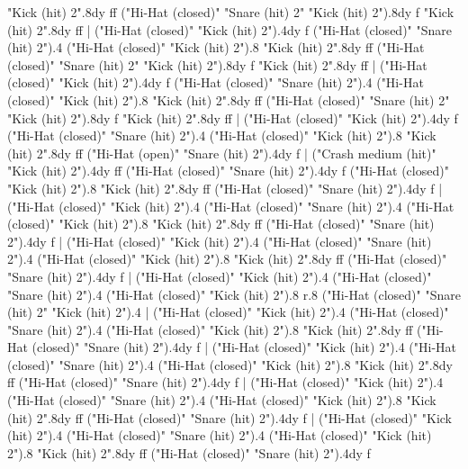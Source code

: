       "Kick (hit) 2".8{dy ff}
      ("Hi-Hat (closed)" "Snare (hit) 2" "Kick (hit) 2").8{dy f}
      "Kick (hit) 2".8{dy ff}
    |
      ("Hi-Hat (closed)" "Kick (hit) 2").4{dy f}
      ("Hi-Hat (closed)" "Snare (hit) 2").4
      ("Hi-Hat (closed)" "Kick (hit) 2").8
      "Kick (hit) 2".8{dy ff}
      ("Hi-Hat (closed)" "Snare (hit) 2" "Kick (hit) 2").8{dy f}
      "Kick (hit) 2".8{dy ff}
    |
      ("Hi-Hat (closed)" "Kick (hit) 2").4{dy f}
      ("Hi-Hat (closed)" "Snare (hit) 2").4
      ("Hi-Hat (closed)" "Kick (hit) 2").8
      "Kick (hit) 2".8{dy ff}
      ("Hi-Hat (closed)" "Snare (hit) 2" "Kick (hit) 2").8{dy f}
      "Kick (hit) 2".8{dy ff}
    |
      ("Hi-Hat (closed)" "Kick (hit) 2").4{dy f}
      ("Hi-Hat (closed)" "Snare (hit) 2").4
      ("Hi-Hat (closed)" "Kick (hit) 2").8
      "Kick (hit) 2".8{dy ff}
      ("Hi-Hat (open)" "Snare (hit) 2").4{dy f}
    |
      ("Crash medium (hit)" "Kick (hit) 2").4{dy ff}
      ("Hi-Hat (closed)" "Snare (hit) 2").4{dy f}
      ("Hi-Hat (closed)" "Kick (hit) 2").8
      "Kick (hit) 2".8{dy ff}
      ("Hi-Hat (closed)" "Snare (hit) 2").4{dy f}
    |
      ("Hi-Hat (closed)" "Kick (hit) 2").4
      ("Hi-Hat (closed)" "Snare (hit) 2").4
      ("Hi-Hat (closed)" "Kick (hit) 2").8
      "Kick (hit) 2".8{dy ff}
      ("Hi-Hat (closed)" "Snare (hit) 2").4{dy f}
    |
      ("Hi-Hat (closed)" "Kick (hit) 2").4
      ("Hi-Hat (closed)" "Snare (hit) 2").4
      ("Hi-Hat (closed)" "Kick (hit) 2").8
      "Kick (hit) 2".8{dy ff}
      ("Hi-Hat (closed)" "Snare (hit) 2").4{dy f}
    |
      ("Hi-Hat (closed)" "Kick (hit) 2").4
      ("Hi-Hat (closed)" "Snare (hit) 2").4
      ("Hi-Hat (closed)" "Kick (hit) 2").8
      r.8
      ("Hi-Hat (closed)" "Snare (hit) 2" "Kick (hit) 2").4
    |
      ("Hi-Hat (closed)" "Kick (hit) 2").4
      ("Hi-Hat (closed)" "Snare (hit) 2").4
      ("Hi-Hat (closed)" "Kick (hit) 2").8
      "Kick (hit) 2".8{dy ff}
      ("Hi-Hat (closed)" "Snare (hit) 2").4{dy f}
    |
      ("Hi-Hat (closed)" "Kick (hit) 2").4
      ("Hi-Hat (closed)" "Snare (hit) 2").4
      ("Hi-Hat (closed)" "Kick (hit) 2").8
      "Kick (hit) 2".8{dy ff}
      ("Hi-Hat (closed)" "Snare (hit) 2").4{dy f}
    |
      ("Hi-Hat (closed)" "Kick (hit) 2").4
      ("Hi-Hat (closed)" "Snare (hit) 2").4
      ("Hi-Hat (closed)" "Kick (hit) 2").8
      "Kick (hit) 2".8{dy ff}
      ("Hi-Hat (closed)" "Snare (hit) 2").4{dy f}
    |
      ("Hi-Hat (closed)" "Kick (hit) 2").4
      ("Hi-Hat (closed)" "Snare (hit) 2").4
      ("Hi-Hat (closed)" "Kick (hit) 2").8
      "Kick (hit) 2".8{dy ff}
      ("Hi-Hat (closed)" "Snare (hit) 2").4{dy f}
